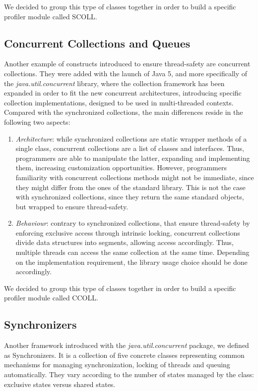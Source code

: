 \documentclass[]{usiinfthesis}
\begin{document}
\noindent
We decided to group this type of classes together in order to build a specific profiler module called SCOLL.

\subsection{Concurrent Collections and Queues}
Another example of constructs introduced to ensure thread-safety are concurrent collections. They were added with the launch of Java 5, and more specifically of the \textit{java.util.concurrent} library, where the collection framework has been expanded in order to fit the new concurrent architectures, introducing specific collection implementations, designed to be used in multi-threaded contexts. Compared with the synchronized collections, the main differences reside in the following two aspects:
\begin{enumerate}
    \item \textit{Architecture}: while synchronized collections are static wrapper methods of a single class, concurrent collections are a list of classes and interfaces. Thus, programmers are able to manipulate the latter, expanding and implementing them, increasing customization opportunities. However, programmers familiarity with concurrent collections methods might not be immediate, since they might differ from the ones of the standard library. This is not the case with synchronized collections, since they return the same standard objects, but wrapped to ensure thread-safety.  
    \item \textit{Behaviour}: contrary to synchronized collections, that ensure thread-safety by enforcing exclusive access through intrinsic locking, concurrent collections divide data structures into segments, allowing access accordingly. Thus, multiple threads can access the same collection at the same time. Depending on the implementation requirement, the library usage choice should be done accordingly.
\end{enumerate}

\noindent
We decided to group this type of classes together in order to build a specific profiler module called CCOLL.


\subsection{Synchronizers}
Another framework introduced with the \textit{java.util.concurrent} package, we defined as Synchronizers. It is a collection of five concrete classes representing common mechanisms for managing synchronization, locking of threads and queuing automatically. They vary according to the number of states managed by the class: exclusive states versus shared states.
\end{document}
